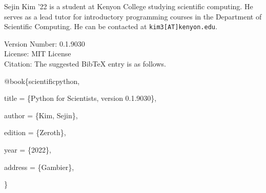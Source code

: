 \documentclass{book}
\newcommand{\booklicense}{MIT License}
\newcommand{\bookversion}{0.1.9030}
\begin{document}


















\backmatter

\printindex

\noindent Sejin Kim '22 is a student at Kenyon College studying scientific computing. He serves as a lead tutor for introductory programming courses in the Department of Scientific Computing. He can be contacted at \verb|kim3[AT]kenyon.edu|.

\begin{titlepage}
\begin{flushleft}
Version Number: \bookversion\\
License: \booklicense\\
Citation: The suggested BibTeX entry is as follows.

\vspace{5mm}

{\selectfont
@book\{scientificpython,

    title = \{Python for Scientists, version \bookversion\},

    author = \{Kim, Sejin\},

    edition = \{Zeroth\},

    year = \{2022\},

    address = \{Gambier\},

\}
}
\end{flushleft}
\end{titlepage}
\restoregeometry
\end{document}
